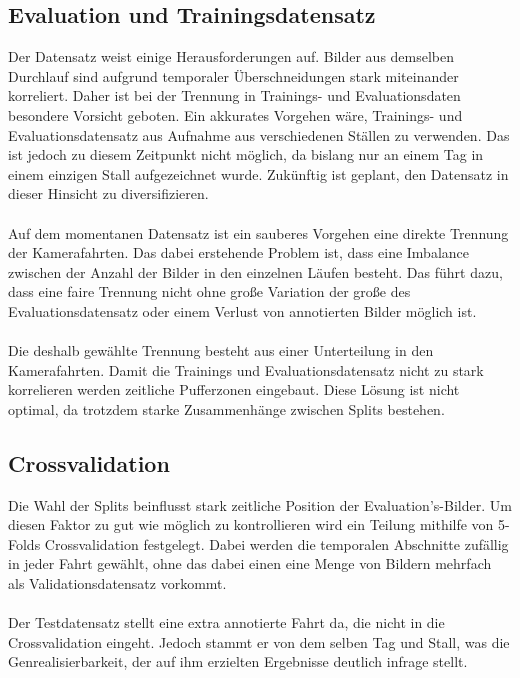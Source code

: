 \documentclass[12pt,DIV=15,BCOR=15mm,twoside,headsepline,abstract=true,listof=totoc,bibliography=totoc]{scrreprt}
\theoremstyle{remark}    %
\begin{document}
    \subsection{Evaluation und Trainingsdatensatz}
    Der Datensatz weist einige Herausforderungen auf. Bilder aus demselben Durchlauf sind aufgrund temporaler Überschneidungen stark miteinander korreliert.
    Daher ist bei der Trennung in Trainings- und Evaluationsdaten besondere Vorsicht geboten.
    Ein akkurates Vorgehen wäre, Trainings- und Evaluationsdatensatz aus Aufnahme aus verschiedenen Ställen zu verwenden. Das ist jedoch zu diesem
    Zeitpunkt nicht möglich, da bislang nur an einem Tag in einem einzigen Stall aufgezeichnet wurde. Zukünftig ist geplant, den Datensatz in dieser Hinsicht 
    zu diversifizieren.\\\\
    Auf dem momentanen Datensatz ist ein sauberes Vorgehen eine direkte Trennung der Kamerafahrten. 
    Das dabei erstehende Problem ist, dass eine Imbalance zwischen der Anzahl der Bilder in den einzelnen Läufen besteht.
    Das führt dazu, dass eine faire Trennung nicht ohne große Variation der große des Evaluationsdatensatz oder einem Verlust von annotierten Bilder möglich ist.\\\\
    Die deshalb gewählte Trennung besteht aus einer Unterteilung in den Kamerafahrten. Damit die Trainings und
    Evaluationsdatensatz nicht zu stark korrelieren werden zeitliche Pufferzonen eingebaut. Diese Lösung ist nicht optimal, da trotzdem starke Zusammenhänge 
    zwischen Splits bestehen.
    
    \subsection{Crossvalidation}
    Die Wahl der Splits beinflusst stark zeitliche Position der Evaluation's-Bilder. Um diesen Faktor zu gut wie möglich zu kontrollieren wird
    ein Teilung mithilfe von 5-Folds Crossvalidation festgelegt. Dabei werden die temporalen Abschnitte zufällig in jeder Fahrt gewählt, ohne das dabei
    einen eine Menge von Bildern mehrfach als Validationsdatensatz vorkommt.\\\\
    Der Testdatensatz stellt eine extra annotierte Fahrt da, die nicht in die Crossvalidation eingeht. Jedoch stammt er von dem selben Tag und Stall, was die 
    Genrealisierbarkeit, der auf ihm erzielten Ergebnisse deutlich infrage stellt.
\end{document}
